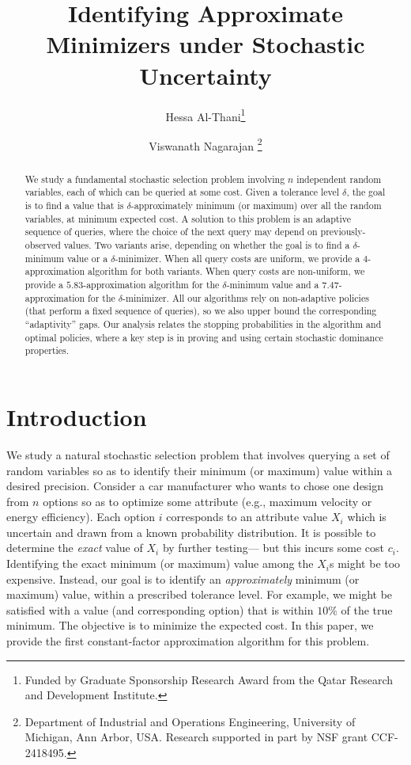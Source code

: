 \documentclass[11pt]{article}
\title{  Identifying Approximate Minimizers under  Stochastic Uncertainty}
\author{Hessa Al-Thani\thanks{Funded by Graduate Sponsorship Research Award from the Qatar Research and Development Institute.} \and Viswanath Nagarajan \thanks{Department of Industrial and Operations Engineering, University of Michigan, Ann Arbor, USA. Research supported in part by NSF grant CCF-2418495.} }
\date{}
\theoremstyle{remark}
\theoremstyle{plain}
\theoremstyle{remark}
\begin{document}
 

\maketitle


\begin{abstract}
    We study a fundamental stochastic selection problem involving  $n$ independent random variables, each of which can be queried     at some cost.  Given a  tolerance level $\delta$, 
     the goal is to find a value that is $\delta$-approximately minimum (or maximum) over all the random variables, at  minimum expected cost. A solution to this problem is an adaptive sequence of queries, where the choice of the next query may depend on previously-observed values.     Two  variants arise, depending on whether the goal is to find a $\delta$-minimum value or a $\delta$-minimizer.    When all query costs are uniform, we provide a $4$-approximation algorithm for both variants.  When query costs are non-uniform, we provide a $5.83$-approximation algorithm for   the $\delta$-minimum value and a $7.47$-approximation for  the $\delta$-minimizer. All our algorithms rely on non-adaptive policies (that perform a fixed sequence of queries), so we also upper bound the corresponding ``adaptivity'' gaps. Our analysis  relates the stopping probabilities in the algorithm and  optimal policies, where a key step is in proving and using certain stochastic dominance properties.  
\end{abstract}


\section{Introduction}

We study a natural stochastic selection problem that involves querying a set of random variables so as to 
identify  their minimum (or maximum)  value   within a desired precision. Consider a car manufacturer who  wants to chose one design from $n$ options so as to  optimize  some attribute (e.g.,  maximum velocity or energy efficiency). Each  option $i$ corresponds to an  attribute value $X_i$ which is uncertain and drawn from  a known probability distribution. It is  possible to  determine the {\em exact} value of   $X_i$ by  further  testing--- but this incurs some cost $c_i$. Identifying the exact minimum (or maximum) value among   the $X_i$s might be too expensive. Instead, our goal is to identify an {\em  approximately}  minimum (or maximum) value, within a prescribed tolerance level. For example, we might be satisfied with  a value (and  corresponding option) that is within  $10$\% of  the true minimum.  The objective is to  minimize the expected cost.  In this paper, we provide the first  constant-factor approximation algorithm for this problem. 
\end{document}
